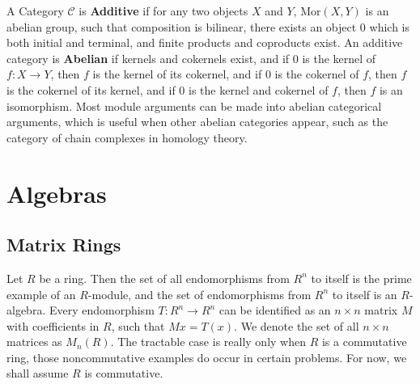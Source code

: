 A Category $\mathcal{C}$ is {\bf Additive} if for any two objects $X$ and $Y$, $\text{Mor}(X,Y)$ is an abelian group, such that composition is bilinear, there exists an object $0$ which is both initial and terminal, and finite products and coproducts exist. An additive category is {\bf Abelian} if kernels and cokernels exist, and if $0$ is the kernel of $f: X \to Y$, then $f$ is the kernel of its cokernel, and if $0$ is the cokernel of $f$, then $f$ is the cokernel of its kernel, and if $0$ is the kernel and cokernel of $f$, then $f$ is an isomorphism. Most module arguments can be made into abelian categorical arguments, which is useful when other abelian categories appear, such as the category of chain complexes in homology theory.

\chapter{Algebras}

\section{Matrix Rings}

Let $R$ be a ring. Then the set of all endomorphisms from $R^n$ to itself is the prime example of an $R$-module, and the set of endomorphisms from $R^n$ to itself is an $R$-algebra. Every endomorphism $T:R^n \to R^n$ can be identified as an $n \times n$ matrix $M$ with coefficients in $R$, such that $Mx = T(x)$. We denote the set of all $n \times n$ matrices as $M_n(R)$. The tractable case is really only when $R$ is a commutative ring, those noncommutative examples do occur in certain problems. For now, we shall assume $R$ is commutative.

